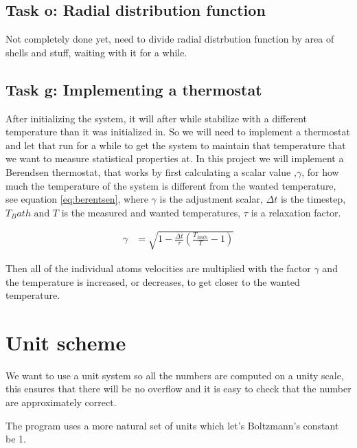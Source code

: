 \documentclass[11pt]{article}
\begin{document}
	\subsection{Task o: Radial distribution function}

		Not completely done yet, need to divide radial distrbution function by area of shells and stuff, waiting with it for a while.



	\subsection{Task g: Implementing a thermostat}
		After initializing the system, it will after while stabilize with a different temperature than it was initialized in. So we will need to implement a thermostat and let that run for a while to get the system to maintain that temperature that we want to measure statistical properties at. In this project we will implement a Berendsen thermostat, that works by first calculating a scalar value ,\(\gamma\), for how much the temperature of the system is different from the wanted temperature, see equation \eqref{eq:berentsen}, where \(\gamma\) is the adjustment scalar, \( \Delta t \) is the timestep, \( T_Bath \text{ and } T\) is the measured and wanted temperatures, \(\tau\) is a relaxation factor. 

		\begin{align}
			\gamma &= \sqrt{ 1 - \frac{\Delta t}{\tau} \left( \frac{T_{Bath}}{T} - 1 \right) } \label{eq:berentsen}
		\end{align}

		Then all of the individual atoms velocities are multiplied with the factor \( \gamma\) and the temperature is increased, or decreases, to get closer to the wanted temperature.



\appendix
	\section{Unit scheme}

	We want to use a unit system so all the numbers are computed on a unity scale, this ensures that there will be no overflow and it is easy to check that the number are approximately correct.


		The program uses a more natural set of units which let's Boltzmann's constant be 1.
\end{document}

